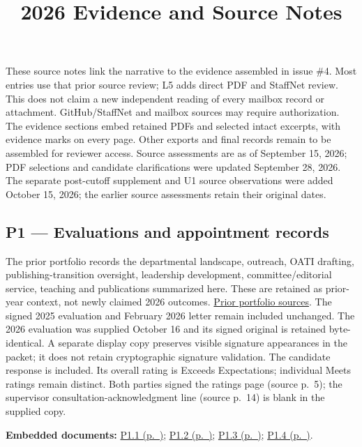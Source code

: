 \title{2026 Evidence and Source Notes}
\portfoliotitle
These source notes link the narrative to the evidence assembled in issue \#4.
Most entries use that prior source review; L5 adds direct PDF and StaffNet review.
This does not claim a new independent reading of every mailbox record or attachment. GitHub/StaffNet and
mailbox sources may require authorization. The evidence sections embed retained PDFs and selected intact excerpts, with
evidence marks on every page. Other exports and final records remain to be
assembled for reviewer access. Source assessments are as of September 15, 2026;
PDF selections and candidate clarifications were updated September 28, 2026.
The separate post-cutoff supplement and U1 source observations were added
October 15, 2026; the earlier source assessments retain their original dates.

\hypertarget{evidence-P1}{}
\subsection{P1 --- Evaluations and appointment records}
The prior portfolio records the departmental landscape, outreach, OATI drafting,
publishing-transition oversight, leadership development, committee/editorial
service, teaching and publications summarized here. These are retained as
prior-year context, not newly claimed 2026 outcomes.
\href{https://github.com/molikd/Molik-Tenure-Document/tree/5e97bb3}{Prior portfolio sources}.
The signed 2025 evaluation and February 2026 letter remain included unchanged.
The 2026 evaluation was supplied October 16 and its signed original is retained byte-identical. A separate display copy
preserves visible signature appearances in the packet; it does not retain
cryptographic signature validation. The candidate response is included. Its overall rating is Exceeds
Expectations; individual Meets ratings remain distinct. Both parties signed the
ratings page (source p.~5); the supervisor consultation-acknowledgment line
(source p.~14) is blank in the supplied copy.

\par\medskip\noindent\textbf{Embedded documents:} \hyperref[supplement-P1.1]{P1.1 (p.~\pageref{supplement-P1.1})}; \hyperref[supplement-P1.2]{P1.2 (p.~\pageref{supplement-P1.2})}; \hyperref[supplement-P1.3]{P1.3 (p.~\pageref{supplement-P1.3})}; \hyperref[supplement-P1.4]{P1.4 (p.~\pageref{supplement-P1.4})}.

